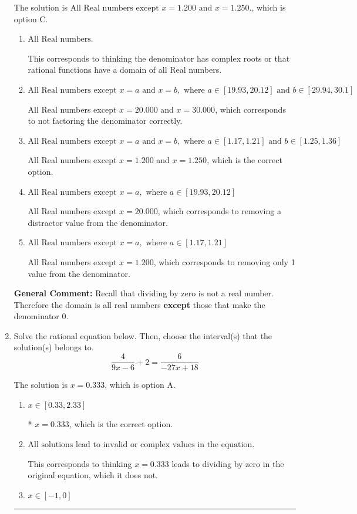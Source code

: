 \documentclass{extbook}[14pt]
\newcommand{\litem}[1]{\item #1

\rule{\textwidth}{0.4pt}}
\begin{document}
\begin{enumerate}
{The solution is \( \text{All Real numbers except } x = 1.200 \text{ and } x = 1.250. \), which is option C.\begin{enumerate}[label=\Alph*.]
\item \( \text{All Real numbers.} \)

This corresponds to thinking the denominator has complex roots or that rational functions have a domain of all Real numbers.
\item \( \text{All Real numbers except } x = a \text{ and } x = b, \text{ where } a \in [19.93, 20.12] \text{ and } b \in [29.94, 30.1] \)

All Real numbers except $x = 20.000$ and $x = 30.000$, which corresponds to not factoring the denominator correctly.
\item \( \text{All Real numbers except } x = a \text{ and } x = b, \text{ where } a \in [1.17, 1.21] \text{ and } b \in [1.25, 1.36] \)

All Real numbers except $x = 1.200$ and $x = 1.250$, which is the correct option.
\item \( \text{All Real numbers except } x = a, \text{ where } a \in [19.93, 20.12] \)

All Real numbers except $x = 20.000$, which corresponds to removing a distractor value from the denominator.
\item \( \text{All Real numbers except } x = a, \text{ where } a \in [1.17, 1.21] \)

All Real numbers except $x = 1.200$, which corresponds to removing only 1 value from the denominator.
\end{enumerate}

\textbf{General Comment:} Recall that dividing by zero is not a real number. Therefore the domain is all real numbers \textbf{except} those that make the denominator 0.
}
\litem{
Solve the rational equation below. Then, choose the interval(s) that the solution(s) belongs to.
\[ \frac{4}{9x -6} + 2 = \frac{6}{-27x + 18} \]

The solution is \( x = 0.333 \), which is option A.\begin{enumerate}[label=\Alph*.]
\item \( x \in [0.33,2.33] \)

* $x = 0.333$, which is the correct option.
\item \( \text{All solutions lead to invalid or complex values in the equation.} \)

This corresponds to thinking $x = 0.333$ leads to dividing by zero in the original equation, which it does not.
\item \( x \in [-1,0] \)


\end{enumerate}}
\end{enumerate}
\end{document}
